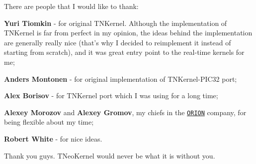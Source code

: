 There are people that I would like to thank\+:


\begin{DoxyItemize}
\item {\bfseries Yuri Tiomkin} -\/ for original T\+N\+Kernel. Although the implementation of T\+N\+Kernel is far from perfect in my opinion, the ideas behind the implementation are generally really nice (that's why I decided to reimplement it instead of starting from scratch), and it was great entry point to the real-\/time kernels for me;
\item {\bfseries Anders Montonen} -\/ for original implementation of T\+N\+Kernel-\/\+P\+I\+C32 port;
\item {\bfseries Alex Borisov} -\/ for T\+N\+Kernel port which I was using for a long time;
\item {\bfseries Alexey Morozov} and {\bfseries Alexey Gromov}, my chiefs in the \href{http://orionspb.ru/}{\tt O\+R\+I\+O\+N} company, for being flexible about my time;
\item {\bfseries Robert White} -\/ for nice ideas.
\end{DoxyItemize}

Thank you guys. T\+Neo\+Kernel would never be what it is without you. 